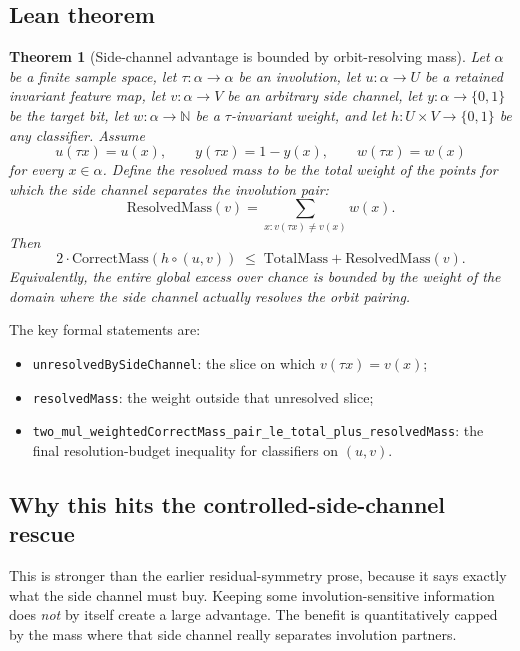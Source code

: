 \documentclass[11pt]{article}
\newtheorem{theorem}{Theorem}[section]
\theoremstyle{remark}
\begin{document}
\subsection{Lean theorem}

\begin{theorem}[Side-channel advantage is bounded by orbit-resolving mass]
Let \(\alpha\) be a finite sample space, let \(\tau : \alpha \to \alpha\) be an involution, let
\(u : \alpha \to U\) be a retained invariant feature map, let \(v : \alpha \to V\) be an arbitrary
side channel, let \(y : \alpha \to \{0,1\}\) be the target bit, let \(w : \alpha \to \mathbb{N}\)
be a \(\tau\)-invariant weight, and let \(h : U \times V \to \{0,1\}\) be any classifier.  Assume
\[
  u(\tau x) = u(x), \qquad y(\tau x) = 1-y(x), \qquad w(\tau x) = w(x)
\]
for every \(x \in \alpha\).  Define the \emph{resolved mass} to be the total weight of the points
for which the side channel separates the involution pair:
\[
  \mathrm{ResolvedMass}(v)
  =
  \sum_{x : v(\tau x) \neq v(x)} w(x).
\]
Then
\[
  2 \cdot \mathrm{CorrectMass}(h \circ (u,v))
  \;\le\;
  \mathrm{TotalMass} + \mathrm{ResolvedMass}(v).
\]
Equivalently, the entire global excess over chance is bounded by the weight of the domain where the
side channel actually resolves the orbit pairing.
\end{theorem}

\noindent
The key formal statements are:
\begin{itemize}[leftmargin=1.5em]
  \item \texttt{unresolvedBySideChannel}: the slice on which \(v(\tau x)=v(x)\);
  \item \texttt{resolvedMass}: the weight outside that unresolved slice;
  \item \texttt{two\_mul\_weightedCorrectMass\_pair\_le\_total\_plus\_resolvedMass}: the final
  resolution-budget inequality for classifiers on \((u,v)\).
\end{itemize}

\subsection{Why this hits the controlled-side-channel rescue}

This is stronger than the earlier residual-symmetry prose, because it says exactly what the side
channel must buy.  Keeping some involution-sensitive information does \emph{not} by itself create a
large advantage.  The benefit is quantitatively capped by the mass where that side channel really
separates involution partners.
\end{document}
